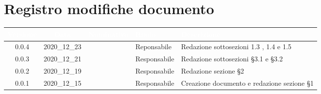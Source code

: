 \section*{Registro modifiche documento}
{
\renewcommand{\arraystretch}{1.5}
\centering
\begin{longtable}{ c c  C{2.3cm} C{3cm} C{3.2cm}}


 \textcolor{white}{\textbf{Versione}}&
    \textcolor{white}{\textbf{Data}}&
    \textcolor{white}{\textbf{Nominativo}}&
    \textcolor{white}{\textbf{Ruolo}}&
    \textcolor{white}{\textbf{Descrizione}}\\	
    \endhead
    
    0.0.4 & 2020\_12\_23 & \MM{} & Reponsabile & Redazione sottosezioni 1.3 , 1.4 e 1.5\\

    0.0.3 & 2020\_12\_21 & \MM{} & Responsabile  & Redazione sottosezioni §3.1 e §3.2 \\

    0.0.2 & 2020\_12\_19 & \MM{} & Responsabile  & Redazione sezione §2\\

    0.0.1 & 2020\_12\_15 & \MM{} & Responsabile  & Creazione documento e redazione sezione §1\\
			
\end{longtable}
}